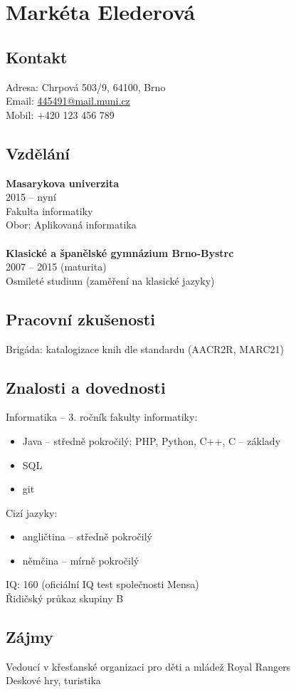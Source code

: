 \documentclass[a4paper,12pt,oneside]{article}
\begin{document}
{\section*{Markéta Elederová}

\subsection*{Kontakt}
 Adresa: Chrpová 503/9, 64100, Brno  \\
 Email: \href{mailto:445491@mail.muni.cz}{445491@mail.muni.cz} \\
 Mobil: +420 123 456 789
 
\subsection*{Vzdělání}
\textbf{Masarykova univerzita} \\
2015 – nyní \\
Fakulta informatiky \\
Obor: Aplikovaná informatika \\
\\
\textbf{Klasické a španělské gymnázium Brno-Bystrc} \\
2007 – 2015 (maturita) \\
Osmileté studium (zaměření na klasické jazyky)

\subsection*{Pracovní zkušenosti}
Brigáda: katalogizace knih dle standardu (AACR2R, MARC21)
    
\subsection*{Znalosti a dovednosti}
Informatika – 3. ročník fakulty informatiky:
\begin{itemize}[label={--}]
\item Java – středně pokročilý; PHP, Python, C++, C – základy
\item SQL
\item git
\end{itemize}

\noindent
Cizí jazyky:
\begin{itemize}[label={--}]
\item angličtina – středně pokročilý
\item němčina – mírně pokročilý
\end{itemize}

\noindent
IQ: 160 (oficiální IQ test společnosti Mensa) \\
Řidičský průkaz skupiny B

\subsection*{Zájmy}
Vedoucí v křesťanské organizaci pro děti a mládež Royal Rangers \\
Deskové hry, turistika}
\end{document}

